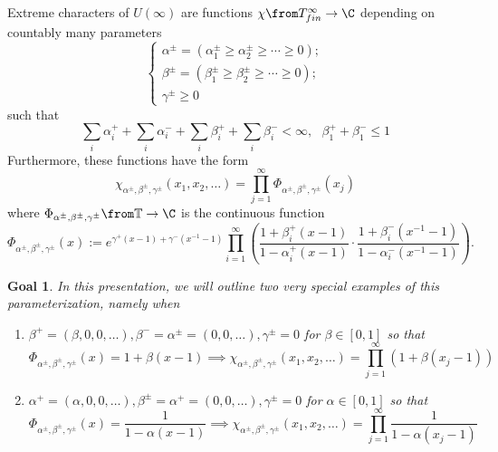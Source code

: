 \documentclass[11pt,leqno,oneside]{amsart}
\numberwithin{thm}{section}
\newcommand{\T}{\mathbb{T}} %
\newtheorem{goal}[thm]{Goal}
\begin{document}
\begin{thm}
  Extreme characters of \(U(\infty)\) are functions \(\chi \from
  T^\infty_{fin} \to \C\) depending on countably many parameters \[
    \begin{cases}
      \alpha^{\pm} = (\alpha_1^\pm \geq \alpha_2^\pm \geq \cdots \geq
      0); \\
      \beta^\pm = (\beta_1^\pm \geq \beta_2^\pm \geq \cdots \geq 0);
      \\
      \gamma^\pm \geq 0
    \end{cases}
  \]
  such that \[
    \sum_i \alpha_i^+ + \sum_i \alpha_i^- + \sum_i \beta_i^+ + \sum_i
    \beta_i^- < \infty, \ \ \ \beta_1^+ + \beta_1^- \leq 1
  \]
  Furthermore, these functions have the form \[
    \chi_{\alpha^\pm, \beta^\pm, \gamma^\pm}(x_1, x_2, \ldots) =
    \prod_{j=1}^\infty \Phi_{\alpha^\pm, \beta^\pm, \gamma^\pm}(x_j)
  \]
  where \(\Phi_{\alpha^\pm, \beta^\pm, \gamma^\pm} \from \T \to \C\)
  is the continuous function \[
    \Phi_{\alpha^\pm ,\beta^\pm, \gamma^\pm}(x) :=
    e^{\gamma^+(x-1)+\gamma^-(x^{-1}-1)} \prod_{i=1}^\infty \left(
      \frac{1+\beta_i^+(x-1)}{1-\alpha_i^{+} (x-1)} \cdot
      \frac{1+\beta_i^-(x^{-1}-1)}{1-\alpha_i^-(x^{-1}-1)}\right).
  \]
\end{thm}
\begin{goal}
  In this presentation, we will outline two very special examples of
  this 
  parameterization, namely when
  \begin{enumerate}
  \item
    \(\beta^+ = (\beta,0,0,\ldots), \beta^- = \alpha^\pm =
    (0,0,\ldots), 
    \gamma^\pm = 0\) for \(\beta \in [0,1]\) so that
    \[ \Phi_{\alpha^\pm ,\beta^\pm, \gamma^\pm}(x) = 1+\beta(x-1) \implies
      \chi_{\alpha^\pm, \beta^\pm, \gamma^\pm}(x_1, x_2, \ldots) =
      \prod_{j=1}^\infty (1+\beta(x_j-1))
    \]
  \item
    \(\alpha^+ = (\alpha,0,0,\ldots), \beta^\pm = \alpha^+ =
    (0,0,\ldots), 
    \gamma^\pm = 0\) for \(\alpha \in [0,1]\) so that
    \[ \Phi_{\alpha^\pm ,\beta^\pm, \gamma^\pm}(x) =
      \frac{1}{1-\alpha(x-1)} \implies \chi_{\alpha^\pm, \beta^\pm,
        \gamma^\pm}(x_1, x_2, \ldots) = \prod_{j=1}^\infty
      \frac{1}{1-\alpha(x_j-1)}
    \]
  \end{enumerate}
\end{goal}
\end{document}
